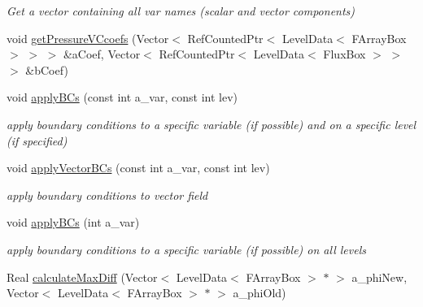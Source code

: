 \begin{DoxyCompactItemize}
\begin{DoxyCompactList}\small\item\em Get a vector containing all var names (scalar and vector components) \end{DoxyCompactList}\item 
void \hyperlink{classamr_mushy_layer_a94dadf602acc348aa6a00714fe5e3338}{get\-Pressure\-V\-Ccoefs} (Vector$<$ Ref\-Counted\-Ptr$<$ Level\-Data$<$ F\-Array\-Box $>$ $>$ $>$ \&a\-Coef, Vector$<$ Ref\-Counted\-Ptr$<$ Level\-Data$<$ Flux\-Box $>$ $>$ $>$ \&b\-Coef)
\item 
\hypertarget{classamr_mushy_layer_a1a941f38c0efa3626ff8bb49278c0e0a}{void \hyperlink{classamr_mushy_layer_a1a941f38c0efa3626ff8bb49278c0e0a}{apply\-B\-Cs} (const int a\-\_\-var, const int lev)}\label{classamr_mushy_layer_a1a941f38c0efa3626ff8bb49278c0e0a}

\begin{DoxyCompactList}\small\item\em apply boundary conditions to a specific variable (if possible) and on a specific level (if specified) \end{DoxyCompactList}\item 
\hypertarget{classamr_mushy_layer_ae00c39bc7eaf2a9203a6779426e27ede}{void \hyperlink{classamr_mushy_layer_ae00c39bc7eaf2a9203a6779426e27ede}{apply\-Vector\-B\-Cs} (const int a\-\_\-var, const int lev)}\label{classamr_mushy_layer_ae00c39bc7eaf2a9203a6779426e27ede}

\begin{DoxyCompactList}\small\item\em apply boundary conditions to vector field \end{DoxyCompactList}\item 
\hypertarget{classamr_mushy_layer_ae495b9a6e1b154a504d5ab31ac3e546a}{void \hyperlink{classamr_mushy_layer_ae495b9a6e1b154a504d5ab31ac3e546a}{apply\-B\-Cs} (int a\-\_\-var)}\label{classamr_mushy_layer_ae495b9a6e1b154a504d5ab31ac3e546a}

\begin{DoxyCompactList}\small\item\em apply boundary conditions to a specific variable (if possible) on all levels \end{DoxyCompactList}\item 
\hypertarget{classamr_mushy_layer_acf79957581036bb510de411d03fd8f10}{Real \hyperlink{classamr_mushy_layer_acf79957581036bb510de411d03fd8f10}{calculate\-Max\-Diff} (Vector$<$ Level\-Data$<$ F\-Array\-Box $>$ $\ast$ $>$ a\-\_\-phi\-New, Vector$<$ Level\-Data$<$ F\-Array\-Box $>$ $\ast$ $>$ a\-\_\-phi\-Old)}\label{classamr_mushy_layer_acf79957581036bb510de411d03fd8f10}


\end{DoxyCompactItemize}
